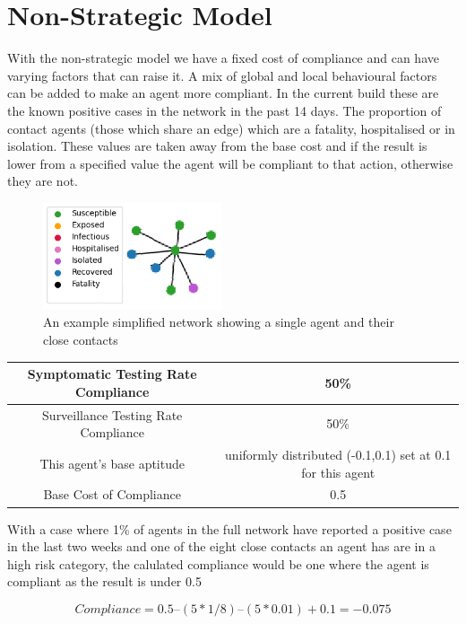 \documentclass{article}
\begin{document}
\newpage

\section{Non-Strategic Model}
With the non-strategic model we have a fixed cost of compliance and can have varying factors that can raise it. A mix of global and local behavioural factors can be added to make an agent more compliant. In the current build these are the known positive cases in the network in the past 14 days. The proportion of contact agents (those which share an edge) which are a fatality, hospitalised or in isolation. These values are taken away from the base cost and if the result is lower from a specified value the agent will be compliant to that action, otherwise they are not.\newline



\begin{figure}[h!]
\centering
\includegraphics[width =150pt]{basicnet}
\caption{An example simplified network showing a single agent and their close contacts}
\end{figure}


\begin{tabular}{|c|c|}
\hline
Symptomatic Testing Rate Compliance & 50\% \\ \hline
Surveillance Testing Rate Compliance & 50\% \\ \hline
This agent’s base aptitude & uniformly distributed (-0.1,0.1) set at 0.1 for this agent \\ \hline
Base Cost of Compliance & 0.5 \\ \hline
\end{tabular}
\newline

With a case where 1\% of agents in the full network have reported a positive case in the last two weeks and one of the eight close contacts an agent has are in a high risk category, the calulated compliance would be one where the agent is compliant as the result is under 0.5

\[Compliance = 0.5 – (5 * 1/8) – (5*0.01) + 0.1 = -0.075\]
\newline
\end{document}
